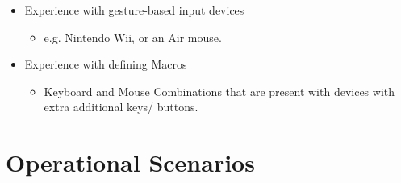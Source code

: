 \documentclass[12pt,a4paper,oneside]{book}
\theoremstyle{plain}
\numberwithin{equation}{chapter}
\newcounter{Secnum}
\begin{document}
\begin{itemize}
    \item Experience with gesture-based input devices
    \begin{itemize}
        \item e.g. Nintendo Wii, or an Air mouse.
    \end{itemize}
    \item Experience with defining Macros
    \begin{itemize}
        \item Keyboard and Mouse Combinations that are present with devices with extra additional keys/ buttons.
    \end{itemize}
\end{itemize}

\section{Operational Scenarios}
\end{document}
